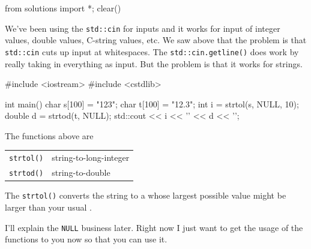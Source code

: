 \begin{python0}
from solutions import *; clear()
\end{python0}

We've been using the \texttt{std::cin} for inputs and it works for input of integer values, double values, C-string values, etc. We saw above that the problem is that \texttt{std::cin} cuts up input at whitespaces. The \texttt{std::cin.getline()} does work by really taking in everything as input. But the problem is that it works for strings.

\begin{consolethree}[escapeinside=||]
#include <iostream>
#include <cstdlib>

int main()
{
    char s[100] = "123";
    char t[100] = "12.3";
    int i = strtol(s, NULL, 10);
    double d = strtod(t, NULL);
    std::cout << i << '\n' << d << '\n';
}
\end{consolethree}

The functions above are

\begin{tabular}{ll}
\texttt{strtol()} & string-to-long-integer \\
\texttt{strtod()} & string-to-double \\
\end{tabular}

The \texttt{strtol()} converts the string to a  whose largest possible value might be larger than your usual .

I'll explain the \texttt{NULL} business later. Right now I just want to get the usage of the functions to you now so that you can use it.


